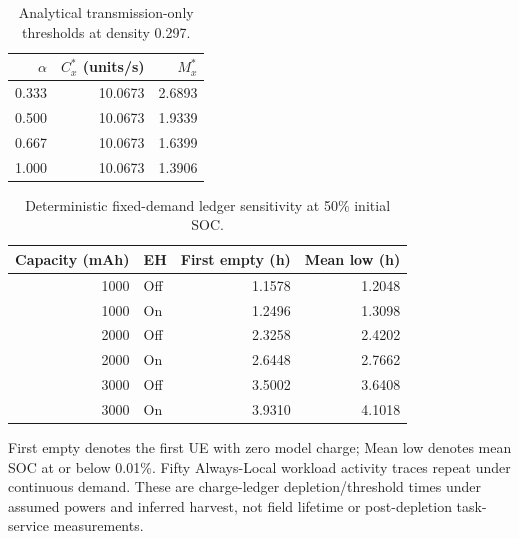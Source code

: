\begin{table}[t]
\centering\footnotesize
\caption{Analytical transmission-only thresholds at density 0.297.}
\label{tab:alpha}
\begin{tabular}{@{}rrr@{}}\toprule
$\alpha$ & $C_x^*$ (units/s) & $M_x^*$\\\midrule
0.333 & 10.0673 & 2.6893 \\
0.500 & 10.0673 & 1.9339 \\
0.667 & 10.0673 & 1.6399 \\
1.000 & 10.0673 & 1.3906 \\
\bottomrule\end{tabular}
\end{table}

\begin{table}[t]
\centering\footnotesize
\caption{Deterministic fixed-demand ledger sensitivity at 50\% initial SOC.}
\label{tab:battery}
\begin{tabular}{@{}rlrr@{}}\toprule
Capacity (mAh) & EH & First empty (h) & Mean low (h)\\\midrule
1000 & Off & 1.1578 & 1.2048 \\
1000 & On & 1.2496 & 1.3098 \\
2000 & Off & 2.3258 & 2.4202 \\
2000 & On & 2.6448 & 2.7662 \\
3000 & Off & 3.5002 & 3.6408 \\
3000 & On & 3.9310 & 4.1018 \\
\bottomrule\end{tabular}

\par\smallskip\begin{minipage}{\columnwidth}\footnotesize First empty denotes the first UE with zero model charge; Mean low denotes mean SOC at or below 0.01\%. Fifty Always-Local workload activity traces repeat under continuous demand. These are charge-ledger depletion/threshold times under assumed powers and inferred harvest, not field lifetime or post-depletion task-service measurements.\end{minipage}
\end{table}
